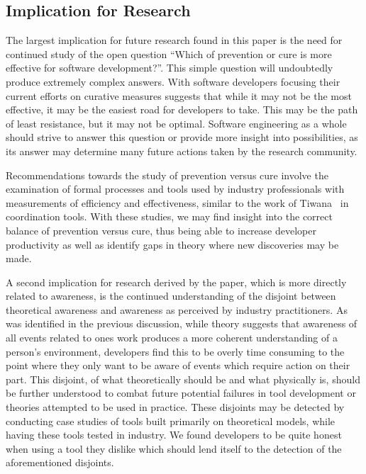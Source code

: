 \documentclass[conference]{IEEEtran}
\begin{document}
\subsection{Implication for Research}
\label{sec:implr}

The largest implication for future research found in this paper is the need for continued study of the open question
``Which of prevention or cure is more effective for software development?''. This simple question will undoubtedly 
produce extremely complex answers. With software developers focusing their current efforts on curative measures suggests
that while it may not be the most effective, it may be the easiest road for developers to take. This may be the path of
least resistance, but it may not be optimal. Software engineering as a whole should strive to answer this question or
provide more insight into possibilities, as its answer may determine many future actions taken by the research community.

Recommendations towards the study of prevention versus cure involve the examination of formal processes and tools used
by industry professionals with measurements of efficiency and effectiveness, similar to the work of
Tiwana~\cite{Tiwana:2008:ICD} in coordination tools. With these studies, we may find insight into the correct balance
of prevention versus cure, thus being able to increase developer productivity as well as identify gaps in theory 
where new discoveries may be made.

A second implication for research derived by the paper, which is more directly related to awareness, is the continued
understanding of the disjoint between theoretical awareness and awareness as perceived by industry practitioners.
As was identified in the previous discussion, while theory suggests that awareness of all events related to ones work
produces a more coherent understanding of a person's environment, developers find this to be overly time consuming
to the point where they only want to be aware of events which require action on their part. This disjoint, of what 
theoretically should be and what physically is, should be further understood to combat future potential failures in
tool development or theories attempted to be used in practice. These disjoints may be detected by conducting case 
studies of tools built primarily on theoretical models, while having these tools tested in industry. We found developers
to be quite honest when using a tool they dislike which should lend itself to the detection of the aforementioned
disjoints.
\end{document}
